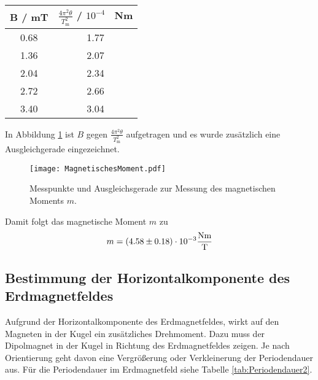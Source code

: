 \begin{table}[H]
  \centering
  \begin{tabular}{c c}
    \toprule
    B / mT & $\frac{4 \pi^2 \theta}{T_\text{m}^2}$ / $10^{-4}$ \ Nm \\
    \midrule
    0.68 & 1.77 \\
    1.36 & 2.07 \\
    2.04 & 2.34 \\
    2.72 & 2.66 \\
    3.40 & 3.04 \\
    \bottomrule
  \end{tabular}
  \caption{}
  \label{tab:BUndMehr}
\end{table}

In Abbildung \ref{fig:magMoment} ist $B$ gegen $\frac{4 \pi^2 \theta}{T_\text{m}^2}$ aufgetragen und es wurde zusätzlich eine Ausgleichgerade eingezeichnet.

\begin{figure}[H]
  \centering
  \texttt{[image: MagnetischesMoment.pdf]}
  \caption{Messpunkte und Ausgleichsgerade zur Messung des magnetischen Moments $m$.}
  \label{fig:magMoment}
\end{figure}

Damit folgt das magnetische Moment $m$ zu
\begin{equation}
  m = (\num{4.58 +- 0.18}) \cdot 10^{-3} \frac{\text{Nm}}{\text{T}}
\end{equation}


\subsection{Bestimmung der Horizontalkomponente des Erdmagnetfeldes}
Aufgrund der Horizontalkomponente des Erdmagnetfeldes, wirkt auf den Magneten in der Kugel ein zusätzliches Drehmoment. Dazu muss der Dipolmagnet in der Kugel in Richtung des Erdmagnetfeldes zeigen. Je nach Orientierung geht davon eine Vergrößerung oder Verkleinerung der Periodendauer aus. Für die Periodendauer im Erdmagnetfeld siehe Tabelle \ref{tab:Periodendauer2}.

